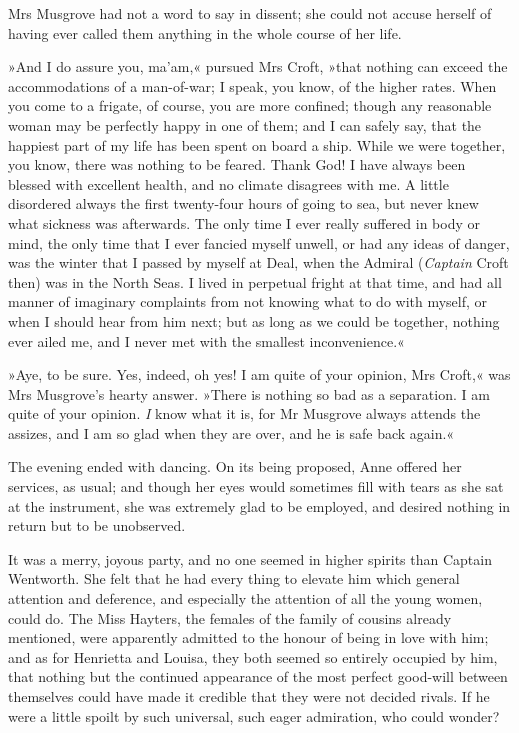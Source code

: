 Mrs Musgrove had not a word to say in dissent; she could not accuse herself of having ever called them anything in the whole course of her life.

»And I do assure you, ma'am,« pursued Mrs Croft, »that nothing can exceed the accommodations of a man-of-war; I speak, you know, of the higher rates. When you come to a frigate, of course, you are more confined; though any reasonable woman may be perfectly happy in one of them; and I can safely say, that the happiest part of my life has been spent on board a ship. While we were together, you know, there was nothing to be feared. Thank God! I have always been blessed with excellent health, and no climate disagrees with me. A little disordered always the first twenty-four hours of going to sea, but never knew what sickness was afterwards. The only time I ever really suffered in body or mind, the only time that I ever fancied myself unwell, or had any ideas of danger, was the winter that I passed by myself at Deal, when the Admiral (\textit{Captain} Croft then) was in the North Seas. I lived in perpetual fright at that time, and had all manner of imaginary complaints from not knowing what to do with myself, or when I should hear from him next; but as long as we could be together, nothing ever ailed me, and I never met with the smallest inconvenience.«

»Aye, to be sure. Yes, indeed, oh yes! I am quite of your opinion, Mrs Croft,« was Mrs Musgrove's hearty answer. »There is nothing so bad as a separation. I am quite of your opinion. \textit{I} know what it is, for Mr Musgrove always attends the assizes, and I am so glad when they are over, and he is safe back again.«

The evening ended with dancing. On its being proposed, Anne offered her services, as usual; and though her eyes would sometimes fill with tears as she sat at the instrument, she was extremely glad to be employed, and desired nothing in return but to be unobserved.

It was a merry, joyous party, and no one seemed in higher spirits than Captain Wentworth. She felt that he had every thing to elevate him which general attention and deference, and especially the attention of all the young women, could do. The Miss Hayters, the females of the family of cousins already mentioned, were apparently admitted to the honour of being in love with him; and as for Henrietta and Louisa, they both seemed so entirely occupied by him, that nothing but the continued appearance of the most perfect good-will between themselves could have made it credible that they were not decided rivals. If he were a little spoilt by such universal, such eager admiration, who could wonder?

